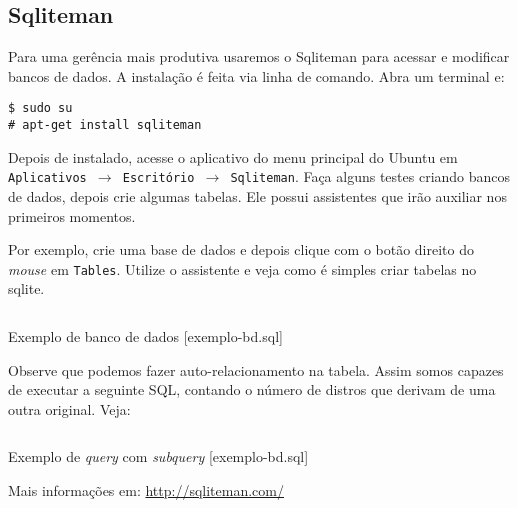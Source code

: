 \subsection{Sqliteman}

Para uma gerência mais produtiva usaremos o Sqliteman para acessar e modificar bancos de dados. A instalação
é feita via linha de comando. Abra um terminal e:

\begin{flushleft}
\texttt{\$ sudo su\\
\# apt-get install sqliteman\\}
\end{flushleft}

Depois de instalado, acesse o aplicativo do menu principal do Ubuntu em \texttt{Aplicativos $\rightarrow$
Escritório $\rightarrow$ Sqliteman}. Faça alguns testes criando bancos de dados, depois crie algumas tabelas.
Ele possui assistentes que irão auxiliar nos primeiros momentos.

Por exemplo, crie uma base de dados e depois clique com o botão direito do \textit{mouse} em \texttt{Tables}.
Utilize o assistente e veja como é simples criar tabelas no sqlite.

\begin{listing}[H]
  \inputminted[linenos=true,frame=bottomline,tabsize=3]{ sql }{ source/exemplo-bd-1.sql }
  \caption{Exemplo de banco de dados [exemplo-bd.sql]}
\end{listing}

Observe que podemos fazer auto-relacionamento na tabela. Assim somos capazes de executar a seguinte SQL,
contando o número de distros que derivam de uma outra original. Veja:

\begin{listing}[H]
  \inputminted[linenos=true,frame=bottomline,tabsize=3]{ sql }{ source/exemplo-bd-2.sql }
  \caption{Exemplo de \textit{query} com \textit{subquery} [exemplo-bd.sql]}
\end{listing}

Mais informações em: \url{http://sqliteman.com/}